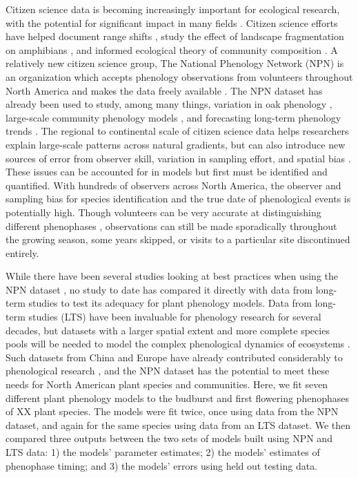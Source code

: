 \documentclass[fleqn,10pt,lineno]{wlpeerj} %
\begin{document}
Citizen science data is becoming increasingly important for ecological research, with the potential for significant impact in many fields \citep{dickinson2010, tulloch2013, kelling2009}. Citizen science efforts have helped document range shifts \citep{hitch2007}, study the effect of landscape fragmentation on amphibians \citep{cosentino2014}, and informed ecological theory of community composition \citep{locey2013}. A relatively new citizen science group, The National Phenology Network (NPN) is an organization which accepts phenology observations from volunteers throughout North America and makes the data freely available \citep{schwartz2012a}. The NPN dataset has already been used to study, among many things, variation in oak phenology \citep{gerst2017}, large-scale community phenology models \citep{melaas2016}, and forecasting long-term phenology trends \citep{jeong2013}. The regional to continental scale of citizen science data helps researchers explain large-scale patterns across natural gradients, but can also introduce new sources of error from observer skill, variation in sampling effort, and spatial bias \citep{dickinson2010}. These issues can be accounted for in models but first must be identified and quantified. With hundreds of observers across North America, the observer and sampling bias for species identification and the true date of phenological events is potentially high. Though volunteers can be very accurate at distinguishing different phenophases \citep{fuccillo2015}, observations can still be made sporadically throughout the growing season, some years skipped, or visits to a particular site discontinued entirely. 

While there have been several studies looking at best practices when using the NPN dataset \citep{crimmins2017, gerst2016}, no study to date has compared it directly with data from long-term studies to test its adequacy for plant phenology models. Data from long-term studies (LTS) have been invaluable for phenology research for several decades, but datasets with a larger spatial extent and more complete species pools will be needed to model the complex phenological dynamics of ecosystems \citep{richardson2012, diez2012, caradonna2014}. Such datasets from China and Europe have already contributed considerably to phenological research \citep{olsson2014, basler2016, xu2013, zhang2017}, and the NPN dataset has the potential to meet these needs for North American plant species and communities. Here, we fit seven different plant phenology models to the budburst and first flowering phenophases of XX plant species. The models were fit twice, once using data from the NPN dataset, and again for the same species using data from an LTS dataset. We then compared three outputs between the two sets of models built using NPN and LTS data: 1) the models' parameter estimates; 2) the models' estimates of phenophase timing; and 3) the models' errors using held out testing data.
\end{document}

